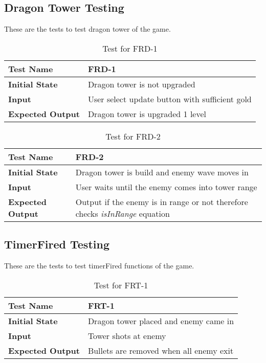 \documentclass[12,english]{article}
\begin{document}
    \subsection{Dragon Tower Testing}
    These are the tests to test dragon tower of the game.
        \begin{table}[h!]
        	\begin{tabular}[r]{|l|l|}
        	    \hline
        		\textbf{Test Name} & FRD-1 \\ 
        		\hline
        		\textbf{Initial State} & Dragon tower is not upgraded\\ 
        		\hline
        		\textbf{Input} & User select update button with sufficient gold\\ 
        		\hline 
        		\textbf{Expected Output} & Dragon tower is upgraded 1 level\\ 
        		\hline
        	\end{tabular}
        	\caption{Test for FRD-1}
        	\label{Table}
        \end{table}
        
        \begin{table}[h!]
        	\begin{tabular}[r]{|l|l|}
        	    \hline
        		\textbf{Test Name} & FRD-2 \\ 
        		\hline
        		\textbf{Initial State} & Dragon tower is build and enemy wave moves in\\ 
        		\hline
        		\textbf{Input} & User waits until the enemy comes into tower range\\ 
        		\hline 
        		\textbf{Expected Output} & Output if the enemy is in range or not therefore checks \textit{isInRange} equation\\ 
        		\hline
        	\end{tabular}
        	\caption{Test for FRD-2}
        	\label{Table}
        \end{table}

    \subsection{TimerFired Testing}
    These are the tests to test timerFired functions of the game.
        \begin{table}[h!]
        	\begin{tabular}[r]{|l|l|}
        	    \hline
        		\textbf{Test Name} & FRT-1 \\ 
        		\hline
        		\textbf{Initial State} & Dragon tower placed and enemy came in\\ 
        		\hline
        		\textbf{Input} & Tower shots at enemy\\ 
        		\hline 
        		\textbf{Expected Output} & Bullets are removed when all enemy exit\\ 
        		\hline
        	\end{tabular}
        	\caption{Test for FRT-1}
        	\label{Table}
        \end{table}
        
\end{document}
